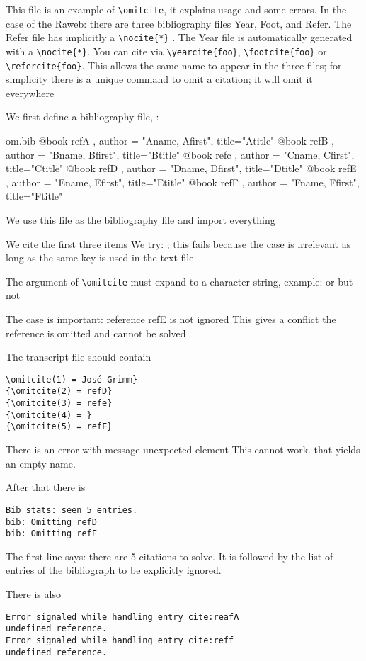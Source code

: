 \documentclass{minimal}
\begin{document}
This file is an example of \verb=\omitcite=, 
it explains usage and some errors. 
In the case of the Raweb: there are three 
bibliography files Year, Foot, and Refer.  
The Refer file has implicitly a \verb=\nocite{*}= .
The Year file is automatically generated with a \verb=\nocite{*}=.
You can cite via \verb=\yearcite{foo}=, \verb=\footcite{foo}= or 
\verb=\refercite{foo}=. This allows the same name to appear in the
three files; for simplicity there is a unique command to omit a
citation; it will omit it everywhere

We first define a bibliography file,  :

\begin{filecontents+}{om.bib}
 @book {refA , author = "Aname,  Afirst",  title="Atitle"}
 @book {refB , author = "Bname,  Bfirst",	title="Btitle"}
 @book {refc , author = "Cname, Cfirst",	title="Ctitle"}
 @book {refD , author = "Dname, Dfirst", title="Dtitle"}
 @book {refE , author = "Ename, Efirst", title="Etitle"}
 @book {refF , author = "Fname, Ffirst", title="Ftitle"}
\end{filecontents+}

We use this file as the bibliography file and import everything

\nocite{*}
We cite the first three items
\cite{refa}\cite{refB} \cite{refC}
We try: \cite{reafA}; this fails because the case is irrelevant as long as
the same key is used in the text file

The argument of \verb=\omitcite=  must expand to a character string, 
example: 
or \def\prefix#1{ref#1}  \omitcite{\prefix D} \omitcite{\prefix e}
but not 

The case is important:  reference refE is not ignored
This gives a conflict  \cite{reff}
the reference is omitted and cannot be solved

The transcript file should contain
\begin{verbatim}
\omitcite(1) = José Grimm}
{\omitcite(2) = refD}
{\omitcite(3) = refe}
{\omitcite(4) = }
{\omitcite(5) = refF}
\end{verbatim}

There is an error with message
  unexpected element This cannot work.
that yields an empty name.

After that there is 
\begin{verbatim}
Bib stats: seen 5 entries.
bib: Omitting refD
bib: Omitting refF
\end{verbatim}
The first line says: there are 5 citations to solve. It is followed by 
the list of entries of the bibliograph to be explicitly ignored.


There is also
\begin{verbatim}
Error signaled while handling entry cite:reafA
undefined reference.
Error signaled while handling entry cite:reff
undefined reference.
\end{verbatim}
\end{document}
